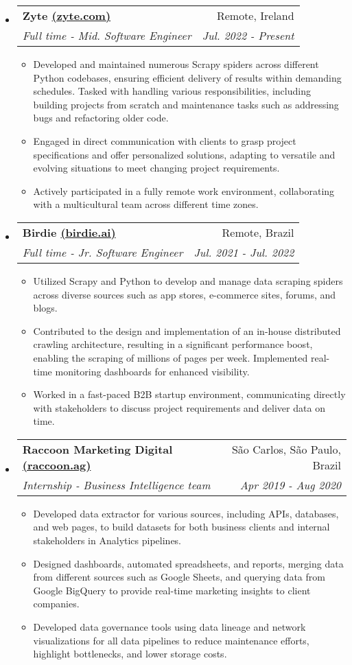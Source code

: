 \documentclass[letterpaper,11pt]{article}
\makeatletter
\newcommand{\resumeItemNoTitle}[1]{
    \item\small{
        {#1 \vspace{-2pt}}
    }
}
\newcommand{\resumeSubheading}[4]{
  \vspace{-1pt}\item
    \begin{tabular*}{0.97\textwidth}[t]{l@{\extracolsep{\fill}}r}
      \textbf{#1} & #2 \\
      \textit{\small#3} & \textit{\small #4} \\
    \end{tabular*}\vspace{-5pt}
}
\newcommand{\resumeSubHeadingListStart}{\begin{itemize}[leftmargin=*]}
\newcommand{\resumeSubHeadingListEnd}{\end{itemize}}
\newcommand{\resumeItemListStart}{\begin{itemize}[leftmargin=*]\setlength\itemsep{1mm}}
\newcommand{\resumeItemListEnd}{\end{itemize}\vspace{-5pt}}
\makeatother
\begin{document}
\resumeSubHeadingListStart
  \resumeSubheading
      {Zyte \href{https://zyte.com}{(zyte.com)}}{Remote, Ireland}
      {Full time - Mid. Software Engineer}{Jul. 2022 - Present}
      \resumeItemListStart
        \resumeItemNoTitle
            {
            Developed and maintained numerous Scrapy spiders across different Python codebases, ensuring efficient delivery of results within demanding schedules. Tasked with handling various responsibilities, including building projects from scratch and maintenance tasks such as addressing bugs and refactoring older code.
            }
        \resumeItemNoTitle
            {
            Engaged in direct communication with clients to grasp project specifications and offer personalized solutions, adapting to versatile and evolving situations to meet changing project requirements.
            }
        \resumeItemNoTitle
            {
            Actively participated in a fully remote work environment, collaborating with a multicultural team across different time zones.
            }
      \resumeItemListEnd
  \resumeSubheading
      {Birdie \href{https://birdie.ai}{(birdie.ai)}}{Remote, Brazil}
      {Full time - Jr. Software Engineer}{Jul. 2021 - Jul. 2022}
      \resumeItemListStart
        \resumeItemNoTitle
          {
          Utilized Scrapy and Python to develop and manage data scraping spiders across diverse sources such as app stores, e-commerce sites, forums, and blogs.
          }
        \resumeItemNoTitle
          {
           Contributed to the design and implementation of an in-house distributed crawling architecture, resulting in a significant performance boost, enabling the scraping of millions of pages per week. Implemented real-time monitoring dashboards for enhanced visibility.
          }
        \resumeItemNoTitle
          {
          Worked in a fast-paced B2B startup environment, communicating directly with stakeholders to discuss project requirements and deliver data on time.
          }
      \resumeItemListEnd
    \resumeSubheading
      {Raccoon Marketing Digital \href{https://birdie.ai}{(raccoon.ag)}}{São Carlos, São Paulo, Brazil}
      {Internship - Business Intelligence team}{Apr 2019 - Aug 2020}
      \resumeItemListStart
        \resumeItemNoTitle
        {
        Developed data extractor for various sources, including APIs, databases, and web pages, to build datasets for both business clients and internal stakeholders in Analytics pipelines.
        }
        \resumeItemNoTitle
          {
          Designed dashboards, automated spreadsheets, and reports, merging data from different sources such as Google Sheets, and querying data from Google BigQuery to provide real-time marketing insights to client companies.
          }
          \resumeItemNoTitle
          {
          Developed data governance tools using data lineage and network visualizations for all data pipelines to reduce maintenance efforts, highlight bottlenecks, and lower storage costs.
          }
      \resumeItemListEnd
  \resumeSubHeadingListEnd
  
\end{document}
